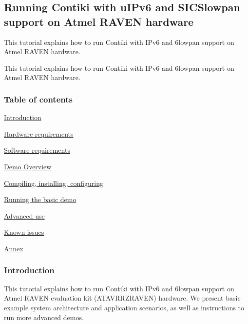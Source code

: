 \hypertarget{a00058}{\subsection{\-Running \-Contiki with u\-I\-Pv6 and \-S\-I\-C\-Slowpan support on \-Atmel \-R\-A\-V\-E\-N hardware}
\label{a00058}
}


\-This tutorial explains how to run \-Contiki with \-I\-Pv6 and 6lowpan support on \-Atmel \-R\-A\-V\-E\-N hardware.  


\-This tutorial explains how to run \-Contiki with \-I\-Pv6 and 6lowpan support on \-Atmel \-R\-A\-V\-E\-N hardware. \hypertarget{a00058_toc}{}\subsubsection{\-Table of contents}\label{a00058_toc}
\hyperlink{a00058_introduction}{\-Introduction}\par
 \hyperlink{a00058_hardware}{\-Hardware requirements}\par
 \hyperlink{a00058_software}{\-Software requirements}\par
 \hyperlink{a00058_overview}{\-Demo \-Overview}\par
 \hyperlink{a00058_installation}{\-Compiling, installing, configuring}\par
 \hyperlink{a00058_running}{\-Running the basic demo}\par
 \hyperlink{a00058_advanced}{\-Advanced use}\par
 \hyperlink{a00058_issues}{\-Known issues}\par
 \hyperlink{a00058_annex}{\-Annex}\par




 \hypertarget{a00058_introduction}{}\subsubsection{\-Introduction}\label{a00058_introduction}
\-This tutorial explains how to run \-Contiki with \-I\-Pv6 and 6lowpan support on \-Atmel \-R\-A\-V\-E\-N evaluation kit (\-A\-T\-A\-V\-R\-R\-Z\-R\-A\-V\-E\-N) hardware. \-We present basic example system architecture and application scenarios, as well as instructions to run more advanced demos.




